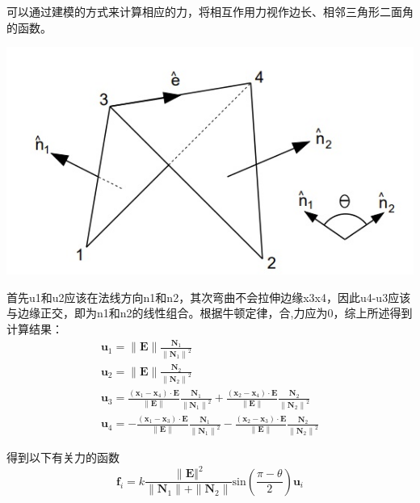 \documentclass{CLGPY}
\begin{document}
\begin{multicols}{2}
		可以通过建模的方式来计算相应的力，将相互作用力视作边长、相邻三角形二面角的函数。
        \begin{center}
            \includegraphics[width=1.0\linewidth]{./fig/二面角.jpg}
        \end{center}

		首先u1和u2应该在法线方向n1和n2，其次弯曲不会拉伸边缘x3x4，因此u4-u3应该与边缘正交，即为n1和n2的线性组合。根据牛顿定律，合,力应为0，综上所述得到计算结果：
		\begin{equation}
		\begin{array}{l}
		\mathbf{u}_{1}=\|\mathbf{E}\| \frac{\mathbf{N}_{1}}{\left\|\mathbf{N}_{1}\right\|^{2}} \\
		\mathbf{u}_{2}=\|\mathbf{E}\| \frac{\mathbf{N}_{2}}{\left\|\mathbf{N}_{2}\right\|^{2}} \\
		\mathbf{u}_{3}=\frac{\left(\mathbf{x}_{1}-\mathbf{x}_{4}\right) \cdot \mathbf{E}}{\|\mathbf{E}\|} \frac{\mathbf{N}_{1}}{\left\|\mathbf{N}_{1}\right\|^{2}}+\frac{\left(\mathbf{x}_{2}-\mathbf{x}_{4}\right) \cdot \mathbf{E}}{\|\mathbf{E}\|} \frac{\mathbf{N}_{2}}{\left\|\mathbf{N}_{2}\right\|^{2}} \\
		\mathbf{u}_{4}=-\frac{\left(\mathbf{x}_{1}-\mathbf{x}_{3}\right) \cdot \mathbf{E}}{\|\mathbf{E}\|} \frac{\mathbf{N}_{1}}{\left\|\mathbf{N}_{1}\right\|^{2}}-\frac{\left(\mathbf{x}_{2}-\mathbf{x}_{3}\right) \cdot \mathbf{E}}{\|\mathbf{E}\|} \frac{\mathbf{N}_{2}}{\left\|\mathbf{N}_{2}\right\|^{2}}
		\end{array}
		\end{equation}

		得到以下有关力的函数
        \begin{equation}
			{\mathbf{f}}_{i}=k\frac{\|\mathbf{E}\Vert^{2}}{\|\mathbf{N}_{1}\|+\|\mathbf{N}_{2}\|}\mathrm{sin}\left(\frac{\pi-\theta}{2}\right)\mathbf{u}_{i}
        \end{equation}


\end{multicols}
\end{document}
